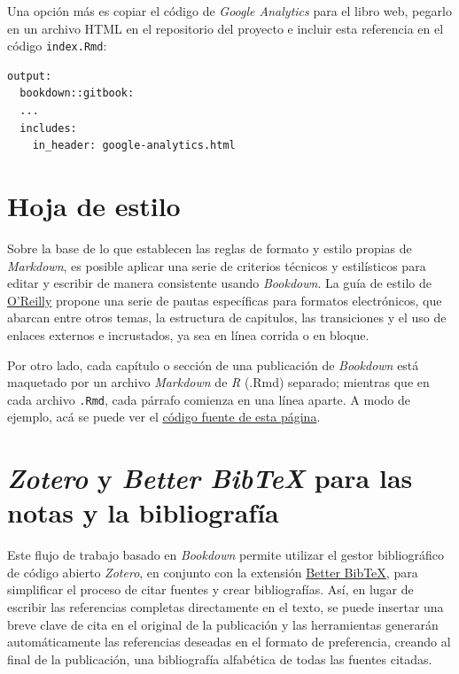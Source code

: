 \documentclass[
]{book}
\begin{document}
Una opción más es copiar el código de \emph{Google Analytics} para el libro web, pegarlo en un archivo HTML en el repositorio del proyecto e incluir esta referencia en el código \texttt{index.Rmd}:

\begin{verbatim}
output:
  bookdown::gitbook:
  ...
  includes:
    in_header: google-analytics.html
\end{verbatim}

\hypertarget{hoja-de-estilo}{%
\section{Hoja de estilo}\label{hoja-de-estilo}}

Sobre la base de lo que establecen las reglas de formato y estilo propias de \emph{Markdown}, es posible aplicar una serie de criterios técnicos y estilísticos para editar y escribir de manera consistente usando \emph{Bookdown}. La guía de estilo de \href{https://oreillymedia.github.io/production-resources/styleguide/}{O'Reilly} propone una serie de pautas específicas para formatos electrónicos, que abarcan entre otros temas, la estructura de capitulos, las transiciones y el uso de enlaces externos e incrustados, ya sea en línea corrida o en bloque.

Por otro lado, cada capítulo o sección de una publicación de \emph{Bookdown} está maquetado por un archivo \emph{Markdown} de \emph{R} (.Rmd) separado; mientras que en cada archivo \texttt{.Rmd}, cada párrafo comienza en una línea aparte. A modo de ejemplo, acá se puede ver el \href{https://github.com/etalii/tepepub/02-componer.Rmd}{código fuente de esta página}.

\hypertarget{zotero-y-better-bibtex-para-las-notas-y-la-bibliografuxeda}{%
\section{\texorpdfstring{\emph{Zotero} y \emph{Better BibTeX} para las notas y la bibliografía}{Zotero y Better BibTeX para las notas y la bibliografía}}\label{zotero-y-better-bibtex-para-las-notas-y-la-bibliografuxeda}}

Este flujo de trabajo basado en \emph{Bookdown} permite utilizar el gestor bibliográfico de código abierto \emph{Zotero}, en conjunto con la extensión \href{https://retorque.re/zotero-better-bibtex/}{Better BibTeX}, para simplificar el proceso de citar fuentes y crear bibliografías. Así, en lugar de escribir las referencias completas directamente en el texto, se puede insertar una breve clave de cita en el original de la publicación y las herramientas generarán automáticamente las referencias deseadas en el formato de preferencia, creando al final de la publicación, una bibliografía alfabética de todas las fuentes citadas.
\end{document}
